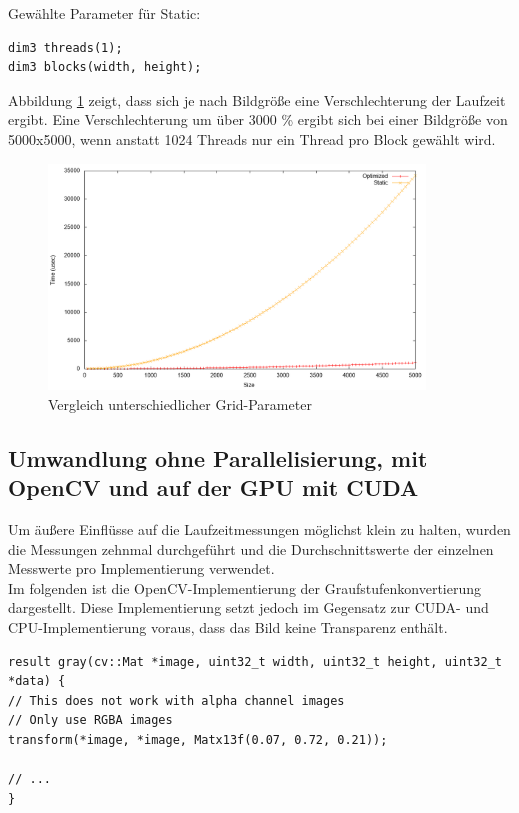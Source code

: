 \documentclass{llncs}
\begin{document}
Gewählte Parameter für \glqq Static\grqq{}:
\begin{lstlisting}
dim3 threads(1);
dim3 blocks(width, height);
\end{lstlisting}
\vspace*{0.5cm}
Abbildung \ref{fig:analysis_grids} zeigt, dass sich je nach Bildgröße eine Verschlechterung der Laufzeit ergibt. Eine Verschlechterung um über 3000 \% ergibt sich bei einer Bildgröße von 5000x5000, wenn anstatt 1024 Threads nur ein Thread pro Block gewählt wird.

\begin{figure}
	\centering
	\includegraphics[width=10cm,keepaspectratio]{analysis_grids.png}
	\caption{Vergleich unterschiedlicher Grid-Parameter}
	\label{fig:analysis_grids}
\end{figure}
\newpage
%
\subsection{Umwandlung ohne Parallelisierung, mit OpenCV und auf der GPU mit CUDA}
%

Um äußere Einflüsse auf die Laufzeitmessungen möglichst klein zu halten, wurden die Messungen zehnmal durchgeführt und die Durchschnittswerte der einzelnen Messwerte pro Implementierung verwendet.\\

Im folgenden ist die OpenCV-Implementierung der Graufstufenkonvertierung dargestellt. Diese Implementierung setzt jedoch im Gegensatz zur CUDA- und CPU-Implementierung voraus, dass das Bild keine Transparenz enthält.

\begin{lstlisting}
result gray(cv::Mat *image, uint32_t width, uint32_t height, uint32_t *data) {
// This does not work with alpha channel images
// Only use RGBA images
transform(*image, *image, Matx13f(0.07, 0.72, 0.21));

// ...
}
\end{lstlisting}
\vspace*{0.5cm}
\end{document}

